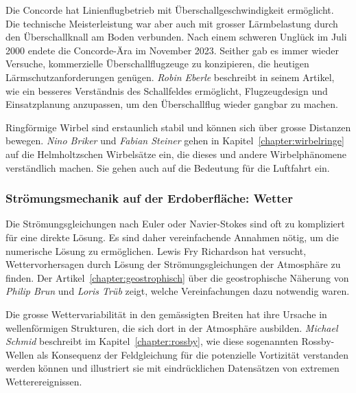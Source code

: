 %
%
Die Concorde hat Linienflugbetrieb mit Überschallgeschwindigkeit
ermöglicht.
Die technische Meisterleistung war aber auch mit grosser Lärmbelastung
durch den Überschallknall am Boden verbunden.
Nach einem schweren Unglück im Juli 2000 endete die Concorde-Ära im 
November 2023.
Seither gab es immer wieder Versuche, kommerzielle Überschallflugzeuge
zu konzipieren, die heutigen Lärmschutzanforderungen genügen.
\emph{Robin Eberle}
%
%
beschreibt in seinem Artikel, wie ein besseres Verständnis des
Schallfeldes ermöglicht, Flugzeugdesign und Einsatzplanung anzupassen,
um den Überschallflug wieder gangbar zu machen.

%
%
Ringförmige Wirbel sind erstaunlich stabil und können sich über
%
grosse Distanzen bewegen.
\emph{Nino Briker}
%
%
und
\emph{Fabian Steiner}
%
%
gehen in Kapitel~\ref{chapter:wirbelringe} auf die Helmholtzschen
%
%
Wirbelsätze ein, die dieses und andere Wirbelphänomene verständlich
machen.
Sie gehen auch auf die Bedeutung für die Luftfahrt ein.
%

%
%
\subsubsection{Strömungsmechanik auf der Erdoberfläche: Wetter}

%
%
Die Strömungsgleichungen nach Euler oder Navier-Stokes
sind oft zu kompliziert für eine direkte Lösung.
Es sind daher vereinfachende Annahmen nötig, um die numerische
Lösung zu ermöglichen.
Lewis Fry Richardson hat versucht, Wettervorhersagen durch Lösung
%
%
der Strömungsgleichungen der Atmosphäre zu finden.
Der Artikel~\ref{chapter:geostrophisch} über die geostrophische
Näherung von 
%
\emph{Philip Brun}
%
%
und
\emph{Loris Trüb}
%
%
zeigt, welche Vereinfachungen dazu notwendig waren.

%
%
Die grosse Wettervariabilität in den gemässigten Breiten hat ihre
%
Ursache in wellenförmigen Strukturen, die sich dort in der Atmosphäre
ausbilden.
\emph{Michael Schmid}
%
%
beschreibt im Kapitel~\ref{chapter:rossby}, wie diese sogenannten
Rossby-Wellen als Konsequenz der Feldgleichung für die potenzielle
Vortizität verstanden werden können und illustriert sie mit
%
eindrücklichen Datensätzen von extremen Wetterereignissen.

